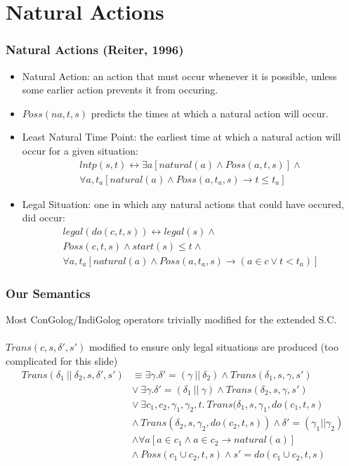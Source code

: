 \documentclass{beamer}
\begin{document}
\section{Natural Actions}

\begin{frame}
\frametitle{Natural Actions (Reiter, 1996)}
\begin{itemize}
  \item Natural Action:  an action that must occur whenever it is possible,
        unless some earlier action prevents it from occuring.
  \item $Poss(na,t,s)$ predicts the times at which a natural action will occur.
  \item Least Natural Time Point: the earliest time at which a natural
        action will occur for a given situation:\[
\begin{array}{c}
lntp(s,t) \leftrightarrow \exists a [natural(a) \wedge Poss(a,t,s)] \wedge\\
\forall a,t_a [natural(a) \wedge Poss(a,t_a,s) \rightarrow t \leq t_a]
\end{array}\]
  \item Legal Situation: one in which any natural actions that could have occured, did occur:\[
\begin{array}{c}
legal(do(c,t,s)) \leftrightarrow legal(s) \wedge\\
Poss(c,t,s) \wedge start(s) \leq t \wedge\\
\forall a,t_a [natural(a) \wedge Poss(a,t_a,s) \rightarrow (a \in c \vee t < t_a)]
\end{array}\]
\end{itemize}
\end{frame}

\begin{frame}
\frametitle{Our Semantics}
Most ConGolog/IndiGolog operators trivially modified for the extended S.C.\\
\ \\
\pause
$Trans(c,s,\delta',s')$ modified to ensure only legal situations are produced
(too complicated for this slide)
\pause
\[\begin{array}{cc}
Trans(\delta_1\ ||\ \delta_2,s,\delta',s') & \equiv \exists \gamma . \delta'=(\gamma\ ||\ \delta_2)\wedge Trans(\delta_1,s,\gamma,s')\\
& \vee\ \exists \gamma . \delta'=(\delta_1\ ||\ \gamma)\wedge Trans(\delta_2,s,\gamma,s')\\
& \vee\ \exists c_1,c_2,\gamma_1,\gamma_2,t.\ Trans(\delta_1,s,\gamma_1,do(c_1,t,s)\\
& \wedge\ Trans(\delta_2,s,\gamma_2,do(c_2,t,s)) \wedge \delta'=(\gamma_1||\gamma_2)\\
& \wedge \forall a\left[a \in c_1 \wedge a \in c_2 \rightarrow natural(a) \right]\\
& \wedge\ Poss(c_1 \cup c_2,t,s) \wedge s'=do(c_1 \cup c_2,t,s)\\
\end{array}\]
\end{frame}
\end{document}
